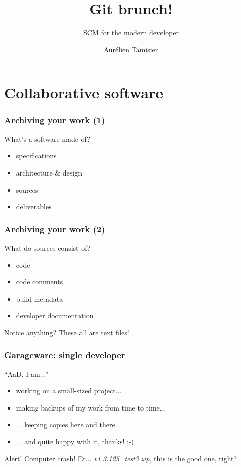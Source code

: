 \documentclass{beamer}
\title{Git brunch!}
\subtitle{SCM for the modern developer}
\author{\href{mailto://virtualtam@flibidi.net}{Aurélien Tamisier}}
\institute{The Internet}
\begin{document}
\frame{\titlepage}

\section{Collaborative software}
\begin{frame}
  \frametitle{Archiving your work (1)}

  What's a software made of?
  \pause
  \begin{itemize}[<+->]
    \item specifications
    \item architecture \& design
    \item sources
    \item deliverables
  \end{itemize}
\end{frame}

\begin{frame}
  \frametitle{Archiving your work (2)}

  What do sources consist of?
  \pause
  \begin{itemize}[<+->]
    \item code
    \item code comments
    \item build metadata
    \item developer documentation
  \end{itemize}
  \pause
  \begin{block}{Notice anything?}
    These all are text files! %
  \end{block}
\end{frame}

\begin{frame}
  \frametitle{Garageware: single developer}

  ``AaD, I am...''
  \pause
  \begin{itemize}[<+->]
    \item working on a small-sized project...
    \item making backups of my work from time to time...
    \item ... keeping copies here and there...
    \item ... and quite happy with it, thanks! ;-)
  \end{itemize}
  \pause
  \begin{alertblock}{Alert! Computer crash!}
    Er... \textit{v1.3.125\_test3.zip}, this is the good one, right?
  \end{alertblock}
\end{frame}
\end{document}
